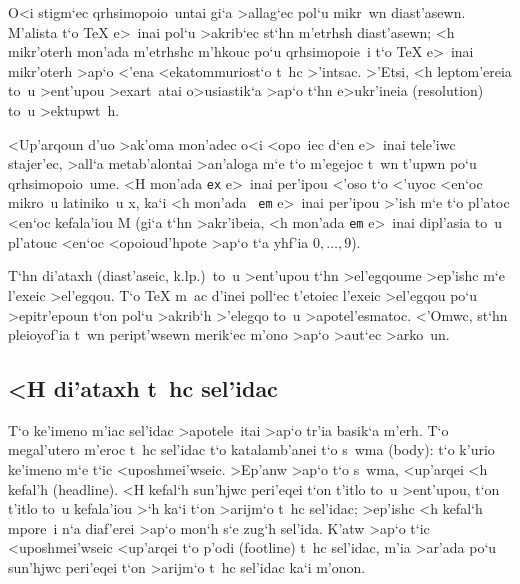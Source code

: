 \maketable [\null]
\bigskip

O<i stigm`ec qrhsimopoio~untai gi`a >allag`ec pol`u mikr~wn
diast'asewn. M'alista t`o {\rm \TeX} e>~inai pol`u >akrib`ec st`hn
m'etrhsh diast'asewn; <h mikr'oterh mon'ada m'etrhshc m'hkouc po`u
qrhsimopoie~i t`o {\rm \TeX} e>~inai mikr'oterh >ap`o <'ena
<ekatommuriost`o t~hc >'intsac. >'Etsi, <h le\-pto\-m'e\-reia to~u
>ent'u\-pou >exar\-t~a\-tai o>u\-sia\-sti\-k`a >ap`o t`hn e>ukr'ineia
({\rm resolution}) to~u >ektupwt~h.

<Up'arqoun d'uo >ak'oma mon'adec o<i <opo~iec d`en e>~inai tele'iwc
stajer'ec, >all`a metab'alontai >an'aloga m`e t`o m'egejoc t~wn t'upwn
po`u qrhsimopoio~ume.  <H mon'ada {\tt ex} e>~inai per'ipou
<'oso t`o <'uyoc <en`oc mikro~u latiniko~u {\rm x}, ka`i <h mon'ada {\tt
em}  e>~inai per'ipou >'ish m`e t`o pl'atoc <en`oc kefala'iou {\rm M}
(gi`a t`hn >akr'ibeia, <h mon'ada {\tt em} e>~inai dipl'asia to~u
pl'atouc <en`oc <opoioud'hpote >ap`o t`a yhf'ia $0,\ldots,9$).

T`hn di'ataxh (diast'aseic, k.lp.)\ to~u >ent'upou t`hn >el'egqoume
>ep'ishc m`e l'exeic >el'egqou.  T`o {\rm \TeX} m~ac d'inei poll`ec
t'etoiec l'exeic >el'egqou po`u >epitr'epoun t`on pol`u >akrib`h
>'elegqo to~u >apotel'esmatoc. <'Omwc, st`hn pleioyof'ia t~wn
peript'wsewn merik`ec m'ono >ap`o >aut`ec >arko~un.

\subsection{<H di'ataxh t~hc sel'idac}

T`o ke'imeno m'iac sel'idac >apotele~itai >ap`o tr'ia basik`a m'erh. T`o
megal'utero m'eroc t~hc sel'idac t`o katalamb'anei t`o {\tengs s~wma\/}
({\rm body}): t`o {\tengs k'urio ke'imeno\/} m`e t`ic  {\tengs
<uposhmei'wseic}. >Ep'anw >ap`o t`o s~wma, <up'arqei <h {\tengs
kefal'h\/} ({\rm headline}). <H kefal`h sun'hjwc peri'eqei t`on t'itlo
to~u >ent'upou, t`on t'itlo to~u kefala'iou >`h ka`i t`on >arijm`o t~hc
sel'idac; >ep'ishc <h kefal`h mpore~i n`a diaf'erei >ap`o mon`h s`e
zug`h sel'ida.  K'atw >ap`o t`ic  <uposhmei'wseic <up'arqei t`o {\tengs
p'odi} ({\rm footline}) t~hc sel'idac, m'ia >ar'ada po`u sun'hjwc
peri'eqei t`on >arijm`o t~hc sel'idac ka`i m'onon.

